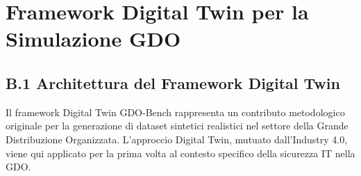 \appendix
\chapter{\texorpdfstring{\textbf{Framework Digital Twin per la Simulazione GDO}}{Appendice B - Framework Digital Twin per la Simulazione GDO}}
\label{app:digital-twin}

\section{\texorpdfstring{\textbf{B.1 Architettura del Framework Digital Twin}}{B.1 - Architettura del Framework Digital Twin}}


Il framework Digital Twin GDO-Bench rappresenta un contributo metodologico originale per la generazione di dataset sintetici realistici nel settore della Grande Distribuzione Organizzata. L'approccio Digital Twin, mutuato dall'Industry 4.0\autocite{tao2019digital}, viene qui applicato per la prima volta al contesto specifico della sicurezza IT nella GDO.
